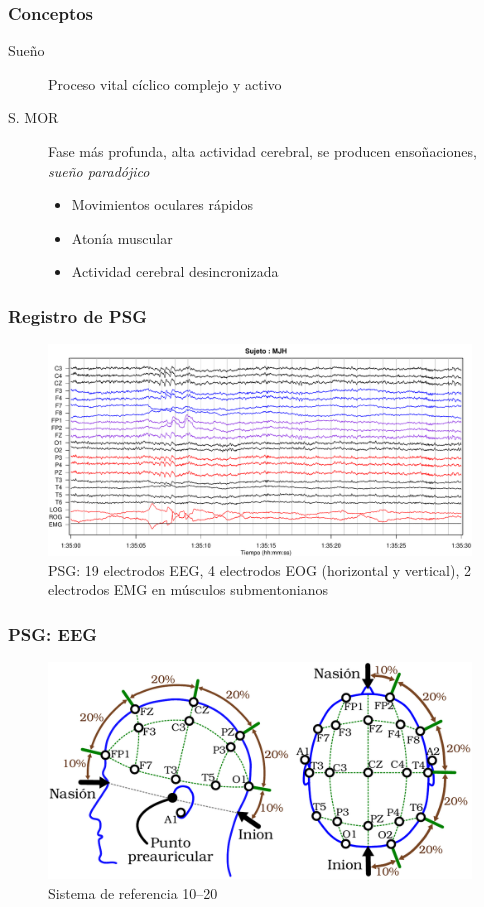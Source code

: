 \documentclass{beamer}
\begin{document}

\begin{frame}
\frametitle{Conceptos}
\begin{description}
\item[Sue\~no] Proceso vital c\'iclico complejo y activo
\item[S. MOR] Fase m\'as profunda, alta actividad cerebral, se producen enso\~naciones, 
\textit{sue\~no parad\'ojico}
\begin{itemize}
\item Movimientos oculares r\'apidos
\item Aton\'ia muscular
\item Actividad cerebral desincronizada
\end{itemize}
\end{description}
\end{frame}

\begin{frame}\frametitle{Registro de PSG}
\begin{figure}
\centering
\includegraphics[width=0.9\linewidth]{./p_170427/MJH_190_PDG_lucirse_PSG.pdf}
\caption{PSG: 19 electrodos EEG, 4 electrodos EOG (horizontal y vertical), 2 electrodos EMG en 
m\'usculos submentonianos}
\end{figure}
\end{frame}


\begin{frame}\frametitle{PSG: EEG}
\begin{figure}
\centering
\includegraphics[width=0.9\linewidth]{cabeza_hecha.pdf} 
\caption{Sistema de referencia 10--20}
\end{figure}
\end{frame}
\end{document}
